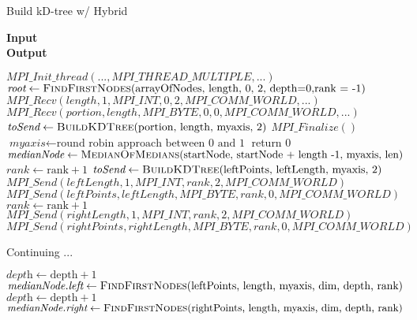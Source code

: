 \documentclass[11pt]{article}
\begin{document}
\begin{algorithm}[H]
\caption{Build kD-tree w/ Hybrid}
\hspace*{\algorithmicindent} \textbf{Input}  \\
\hspace*{\algorithmicindent} \textbf{Output} 
\begin{algorithmic}[1]
\color{orange}
\State $MPI\_Init\_thread(..., MPI\_THREAD\_MULTIPLE, ...)$
\color{black}
\color{blue}
\color{black}
\State $\textit{root} \gets \Call{FindFirstNodes}{$arrayOfNodes, length, 0, 2, depth=0,rank = -1$}$ 
\Else
\color{orange}
\State $MPI\_Recv(length, 1, MPI\_INT, 0, 2, MPI\_COMM\_WORLD, ...)$
\State $MPI\_Recv(portion, length, MPI\_BYTE, 0, 0, MPI\_COMM\_WORLD, ...)$
\color{black}
\State $\textit{toSend} \gets \Call{BuildKDTree}{$portion, length, myaxis, 2$}$ 
\EndIf
\color{orange}
\State $MPI\_Finalize()$
\color{black}
\EndFunction
{}
\Statex
\State $\textit{myaxis} \gets \text{round robin approach between 0 and 1}$
\Statex
{}
\State return 0
\EndIf
\Statex
\State $\textit{medianNode} \gets \Call{MedianOfMedians}{$startNode, startNode + length -1, myaxis, len$}$
\Statex
\color{blue}
\color{black}
\State $\textit{rank} \gets \text{rank} + 1$
\State $\textit{toSend} \gets \Call{BuildKDTree}{$leftPoints, leftLength, myaxis, 2$}$
\Else
\color{orange}
\State $MPI\_Send(leftLength, 1, MPI\_INT, rank, 2, MPI\_COMM\_WORLD)$
\State $MPI\_Send(leftPoints, leftLength, MPI\_BYTE, rank, 0, MPI\_COMM\_WORLD)$
\color{black}
\EndIf
\State $\textit{rank} \gets \text{rank} + 1$
\color{orange}
\State $MPI\_Send(rightLength, 1, MPI\_INT, rank, 2, MPI\_COMM\_WORLD)$
\State $MPI\_Send(rightPoints, rightLength, MPI\_BYTE, rank, 0, MPI\_COMM\_WORLD)$
\color{black}
\EndIf
{}
\end{algorithmic}
\end{algorithm}
Continuing ... 
\begin{algorithm}[h]
\begin{algorithmic}[1]
\State $\textit{depth} \gets \text{depth} + 1$
\State $\textit{medianNode.left} \gets \Call{FindFirstNodes}{$leftPoints, length, myaxis, dim, depth, rank$}$
\color{blue}
\color{black}
\State $\textit{depth} \gets \text{depth} + 1$
\State $\textit{medianNode.right} \gets \Call{FindFirstNodes}{$rightPoints, length, myaxis, dim, depth, rank$}$
\State \Return {}
\EndFunction
\Statex
\end{algorithmic}
\end{algorithm}
 
\end{document}

